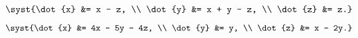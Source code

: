 \begin{multicols}{3}
\begin{enumtasks}
			\label{linsys_hmg:simple3d}
			\item \( \syst{\dot{x} &= x - z, \\ \dot{y} &= x + y - z, \\ \dot{z} &= z.} \) %
			\item \( \syst{\dot{x} &= 4x - 5y - 4z, \\ \dot{y} &= y, \\ \dot{z} &= x - 2y.} \) %

\end{enumtasks}
\end{multicols}
